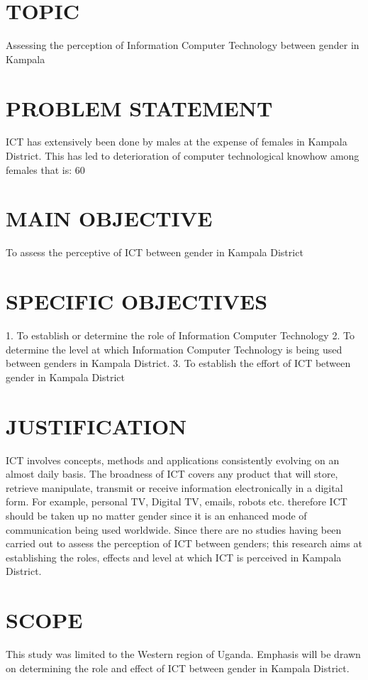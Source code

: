 \documentclass[11pt,A4paper]{article}
\begin{document}
\section{TOPIC}
 Assessing the perception of Information Computer Technology between gender in Kampala
\section{PROBLEM STATEMENT}
ICT has extensively been done by males at the expense of females in Kampala District. This has led to deterioration of computer technological knowhow among females that is: 60%
\section{MAIN OBJECTIVE}
To assess the perceptive of ICT between gender in Kampala District
\section{SPECIFIC OBJECTIVES}
 1. To establish or determine the role of Information Computer Technology
 2. To determine the level at which Information Computer Technology is being used between genders in Kampala District. 
3. To establish the effort of ICT between gender in Kampala District

\section{JUSTIFICATION}
ICT involves concepts, methods and applications consistently evolving on an almost daily basis. The broadness of ICT covers any product that will store, retrieve manipulate, transmit or receive information electronically in a digital form. For example, personal TV, Digital TV, emails, robots etc. therefore ICT should be taken up no matter gender since it is an enhanced mode of communication being used worldwide. Since there are no studies having been carried out to assess the perception of ICT between genders; this research aims at establishing the roles, effects and level at which ICT is perceived in Kampala District. 
\section{SCOPE}
This study was limited to the Western region of Uganda. Emphasis will be drawn on determining the role and effect of ICT between gender in Kampala District.
\end{document}

